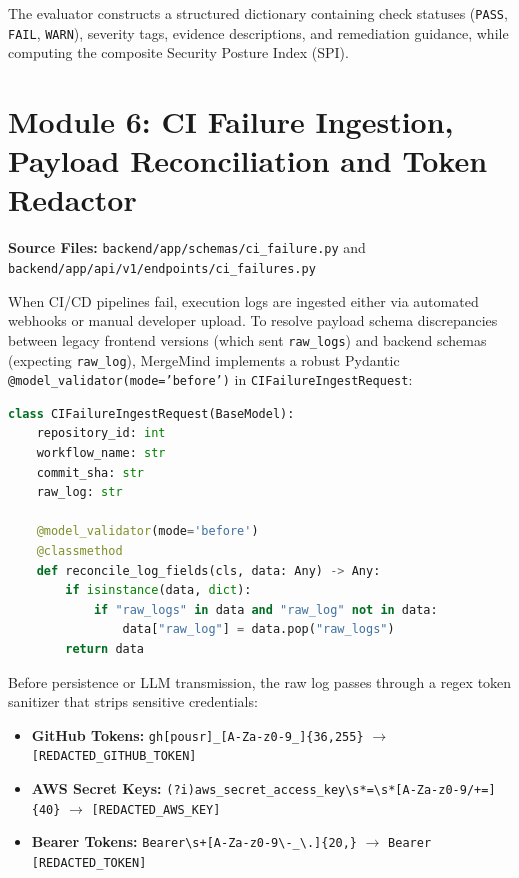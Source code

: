 \documentclass[12pt,a4paper,oneside]{report}
\begin{document}
The evaluator constructs a structured dictionary containing check statuses (\texttt{PASS}, \texttt{FAIL}, \texttt{WARN}), severity tags, evidence descriptions, and remediation guidance, while computing the composite Security Posture Index (SPI).

\section{Module 6: CI Failure Ingestion, Payload Reconciliation and Token Redactor}
\label{sec:impl-ci-failure}

\noindent\textbf{Source Files:} \texttt{backend/app/schemas/ci\_failure.py} and \texttt{backend/app/api/v1/endpoints/ci\_failures.py}

When CI/CD pipelines fail, execution logs are ingested either via automated webhooks or manual developer upload. To resolve payload schema discrepancies between legacy frontend versions (which sent \texttt{raw\_logs}) and backend schemas (expecting \texttt{raw\_log}), MergeMind implements a robust Pydantic \texttt{@model\_validator(mode='before')} in \texttt{CIFailureIngestRequest}:

\begin{lstlisting}[language=Python, caption={Pydantic Dual-Schema Payload Reconciliation Validator}]
class CIFailureIngestRequest(BaseModel):
    repository_id: int
    workflow_name: str
    commit_sha: str
    raw_log: str

    @model_validator(mode='before')
    @classmethod
    def reconcile_log_fields(cls, data: Any) -> Any:
        if isinstance(data, dict):
            if "raw_logs" in data and "raw_log" not in data:
                data["raw_log"] = data.pop("raw_logs")
        return data
\end{lstlisting}

Before persistence or LLM transmission, the raw log passes through a regex token sanitizer that strips sensitive credentials:
\begin{itemize}
    \item \textbf{GitHub Tokens:} \texttt{gh[pousr]\_[A-Za-z0-9\_]\{36,255\}} $\to$ \texttt{[REDACTED\_GITHUB\_TOKEN]}
    \item \textbf{AWS Secret Keys:} \texttt{(?i)aws\_secret\_access\_key\textbackslash s*=\textbackslash s*[A-Za-z0-9/+=]\{40\}} $\to$ \texttt{[REDACTED\_AWS\_KEY]}
    \item \textbf{Bearer Tokens:} \texttt{Bearer\textbackslash s+[A-Za-z0-9\textbackslash-\_\textbackslash.]\{20,\}} $\to$ \texttt{Bearer [REDACTED\_TOKEN]}
\end{itemize}
\end{document}
